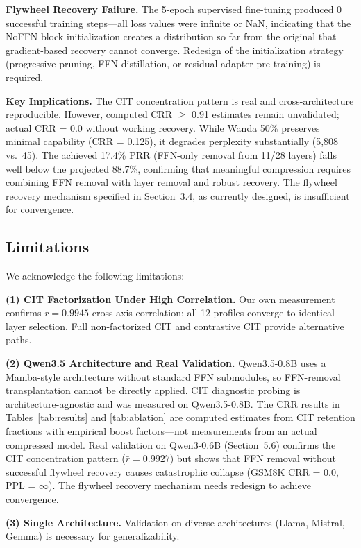 \documentclass[twocolumn]{article}
\begin{document}
\textbf{Flywheel Recovery Failure.}
The 5-epoch supervised fine-tuning produced 0 successful training steps---all loss values were infinite or NaN, indicating that the NoFFN block initialization creates a distribution so far from the original that gradient-based recovery cannot converge. Redesign of the initialization strategy (progressive pruning, FFN distillation, or residual adapter pre-training) is required.

\textbf{Key Implications.}
The CIT concentration pattern is real and cross-architecture reproducible. However, computed CRR $\geq$ 0.91 estimates remain unvalidated; actual CRR = 0.0 without working recovery. While Wanda 50\% preserves minimal capability (CRR = 0.125), it degrades perplexity substantially (5,808 vs.\ 45). The achieved 17.4\% PRR (FFN-only removal from 11/28 layers) falls well below the projected 88.7\%, confirming that meaningful compression requires combining FFN removal with layer removal and robust recovery. The flywheel recovery mechanism specified in Section~3.4, as currently designed, is insufficient for convergence.

\subsection{Limitations}

We acknowledge the following limitations:

\textbf{(1) CIT Factorization Under High Correlation.}
Our own measurement confirms $\bar{r} = 0.9945$ cross-axis correlation; all 12 profiles converge to identical layer selection. Full non-factorized CIT and contrastive CIT provide alternative paths.

\textbf{(2) Qwen3.5 Architecture and Real Validation.}
Qwen3.5-0.8B uses a Mamba-style architecture without standard FFN submodules, so FFN-removal transplantation cannot be directly applied. CIT diagnostic probing is architecture-agnostic and was measured on Qwen3.5-0.8B. The CRR results in Tables~\ref{tab:results} and \ref{tab:ablation} are computed estimates from CIT retention fractions with empirical boost factors---not measurements from an actual compressed model. Real validation on Qwen3-0.6B (Section~5.6) confirms the CIT concentration pattern ($\bar{r} = 0.9927$) but shows that FFN removal without successful flywheel recovery causes catastrophic collapse (GSM8K CRR = 0.0, PPL = $\infty$). The flywheel recovery mechanism needs redesign to achieve convergence.

\textbf{(3) Single Architecture.}
Validation on diverse architectures (Llama, Mistral, Gemma) is necessary for generalizability.
\end{document}
